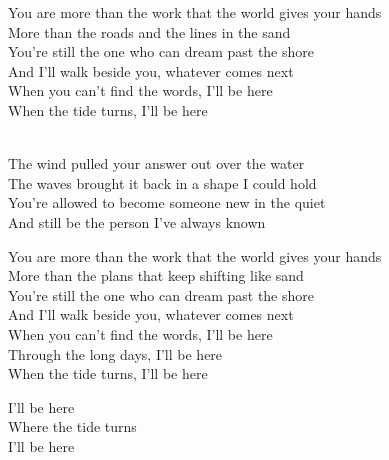 \begin{lyrics}
You are more than the work that the world gives your hands\\
More than the roads and the lines in the sand\\
You’re still the one who can dream past the shore\\
And I’ll walk beside you, whatever comes next\\
When you can’t find the words, I’ll be here\\
When the tide turns, I’ll be here

\\
The wind pulled your answer out over the water
\\
The waves brought it back in a shape I could hold
\\
You’re allowed to become someone new in the quiet
\\
And still be the person I’ve always known

You are more than the work that the world gives your hands\\
More than the plans that keep shifting like sand\\
You’re still the one who can dream past the shore\\
And I’ll walk beside you, whatever comes next\\
When you can’t find the words, I’ll be here\\
Through the long days, I’ll be here\\
When the tide turns, I’ll be here

I’ll be here\\
Where the tide turns\\
I’ll be here
\end{lyrics}

